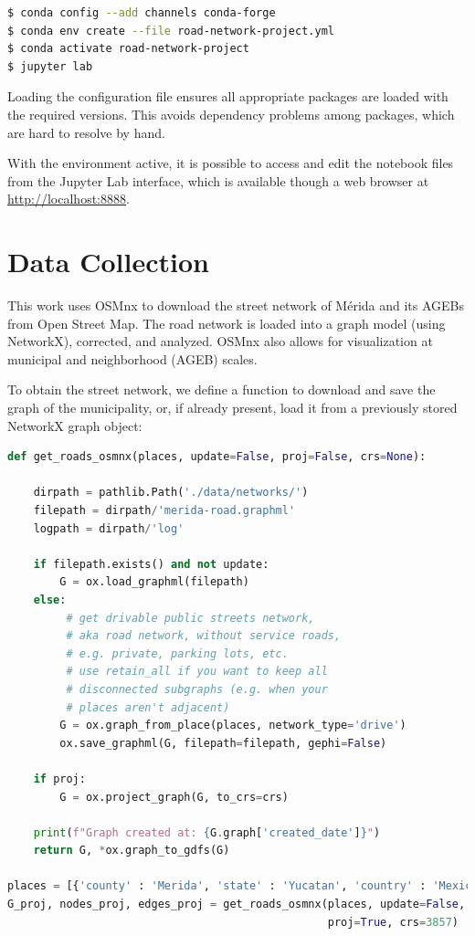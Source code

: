 \begin{lstlisting}[language=bash]
$ conda config --add channels conda-forge
$ conda env create --file road-network-project.yml
$ conda activate road-network-project
$ jupyter lab
\end{lstlisting}

Loading the configuration file ensures all appropriate packages are loaded with the required versions. This avoids dependency problems among packages, which are hard to resolve by hand.

With the environment active, it is possible to access and edit the notebook files from the Jupyter Lab interface, which is available though a web browser at \url{http://localhost:8888}.

\section{Data Collection}

This work uses OSMnx to download the street network of Mérida and its AGEBs from Open Street Map. The road network is loaded into a graph model (using NetworkX), corrected, and analyzed. OSMnx also allows for visualization at municipal and neighborhood (AGEB) scales.

To obtain the street network, we define a function to download and save the graph of the municipality, or, if already present, load it from a previously stored NetworkX graph object:

\begin{lstlisting}[language=Python]
def get_roads_osmnx(places, update=False, proj=False, crs=None):

    dirpath = pathlib.Path('./data/networks/')
    filepath = dirpath/'merida-road.graphml'
    logpath = dirpath/'log'

    if filepath.exists() and not update:
        G = ox.load_graphml(filepath)
    else:
         # get drivable public streets network,
         # aka road network, without service roads,
         # e.g. private, parking lots, etc.
         # use retain_all if you want to keep all
         # disconnected subgraphs (e.g. when your
         # places aren't adjacent)
        G = ox.graph_from_place(places, network_type='drive')
        ox.save_graphml(G, filepath=filepath, gephi=False)

    if proj:
        G = ox.project_graph(G, to_crs=crs)

    print(f"Graph created at: {G.graph['created_date']}")
    return G, *ox.graph_to_gdfs(G)

places = [{'county' : 'Merida', 'state' : 'Yucatan', 'country' : 'Mexico'}]
G_proj, nodes_proj, edges_proj = get_roads_osmnx(places, update=False,
                                                 proj=True, crs=3857)
\end{lstlisting}


